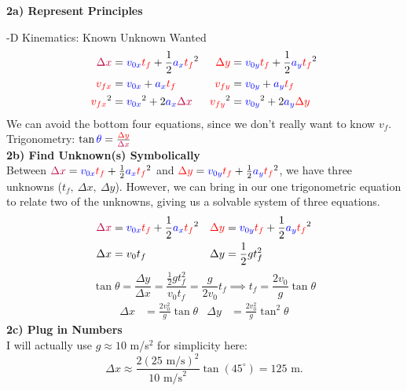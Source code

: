\documentclass[]{article}
\begin{document}
\begin{TeacherMargin}
	\noindent\textbf{2a) Represent Principles}
	
	-D Kinematics: {\color{blue}Known} {\color{red}Unknown} {\color{purple}Wanted}
	\begin{align*}
		{\color{purple}\Delta x} & = {\color{blue}v_{0x}}{\color{red}t_{f}} + \frac{1}{2}{\color{blue}a_{x}}{\color{red}t_{f}}^{2} & {\color{red}\Delta y} & = {\color{blue}v_{0y}}{\color{red}t_{f}} + \frac{1}{2}{\color{blue}a_{y}}{\color{red}t_{f}}^{2} \\
		{\color{red}v_{fx}} & = {\color{blue}v_{0x}} + {\color{blue}a_{x}}{\color{red}t_{f}} & {\color{red}v_{fy}} & = {\color{blue}v_{0y}}+{\color{blue}a_{y}}{\color{red}t_{f}} \\
		{\color{red}v_{fx}}^{2} & = {\color{blue}v_{0x}}^{2} + 2{\color{blue}a_{x}}{\color{purple}\Delta x} & {\color{red}v_{fy}}^{2} & = {\color{blue}v_{0y}}^{2} + 2{\color{blue}a_{y}}{\color{red}\Delta y}
	\end{align*}
	We can avoid the bottom four equations, since we don't really want to know $v_{f}$. \\
	Trigonometry: $\tan{\color{blue}\theta} = \frac{\color{red}\Delta y}{\color{purple}\Delta x}$ \\
	\textbf{2b) Find Unknown(s) Symbolically} \\
	Between ${\color{purple}\Delta x} = {\color{blue}v_{0x}}{\color{red}t_{f}} + \frac{1}{2}{\color{blue}a_{x}}{\color{red}t_{f}}^{2}$ and ${\color{red}\Delta y} = {\color{blue}v_{0y}}{\color{red}t_{f}} + \frac{1}{2}{\color{blue}a_{y}}{\color{red}t_{f}}^{2}$, we have three unknowns ($t_{f},\ \Delta x,\ \Delta y$). However, we can bring in our one trigonometric equation to relate two of the unknowns, giving us a solvable system of three equations.
	\begin{align*}
		{\color{purple}\Delta x} & = {\color{blue}v_{0x}}{\color{red}t_{f}} + \frac{1}{2}{\color{blue}a_{x}}{\color{red}t_{f}}^{2} & {\color{red}\Delta y} & = {\color{blue}v_{0y}}{\color{red}t_{f}} + \frac{1}{2}{\color{blue}a_{y}}{\color{red}t_{f}}^{2} \\
		\Delta x & = v_{0}t_{f} & \Delta y & = \frac{1}{2}gt_{f}^{2}
	\end{align*}
	\[
	\tan\theta = \frac{\Delta y}{\Delta x} = \frac{\frac{1}{2}gt_{f}^{2}}{v_{0}t_{f}} = \frac{g}{2v_{0}}t_{f} \implies t_{f} = \frac{2v_{0}}{g}\tan\theta
	\]
	\begin{align*}
	\Delta x & = \frac{2v_{0}^{2}}{g}\tan\theta & \Delta y & = \frac{2v_{0}^{2}}{g}\tan^{2}\theta
	\end{align*}
	\textbf{2c) Plug in Numbers} \\
	I will actually use $g\approx10$ m/s$^{2}$ for simplicity here:
	\[
	\Delta x \approx \frac{2(25\text{ m/s})^{2}}{10\text{ m/s}^{2}}\tan(45^{\circ}) = 125\text{ m}.
	\]
\end{TeacherMargin}
\end{document}
